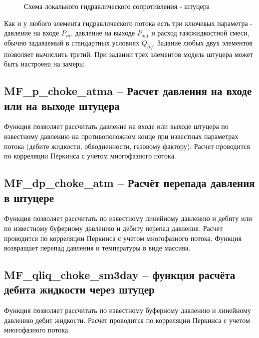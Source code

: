 \begin{figure}[h!]
\begin{center}
	
		\caption{Схема локального гидравлического сопротивления - штуцера}
		\label{ris:Pipe_choke}
		
	\end{center}
\end{figure}



Как и у любого элемента гидравлического потока есть три ключевых параметра - давление на входе \( P_{in} \), давление на выходе \(P_{out}\)  и расход газожидкостной смеси, обычно задаваемый в стандартных условиях \(Q_{liq} \). Задание любых двух элементов позволяет вычислить третий. При задании трех элементов модель штуцера может быть настроена на замеры.
 

\subsection{MF\_p\_choke\_atma – Расчет давления на входе или на выходе штуцера}
Функция позволяет рассчитать давление на входе или выходе штуцера по известному давлению на противоположном конце при известных параметрах потока (дебите жидкости, обводненности, газовому фактору). Расчет проводится по корреляции Перкинса \cite{Perkins_1993} с учетом многофазного потока.  

\subsection{MF\_dp\_choke\_atm – Расчёт перепада давления в штуцере}
Функция позволяет рассчитать по известному линейному давлению и дебиту или по известному буферному давлению и дебиту перепад давления.  Расчет проводится по корреляции Перкинса \cite{Perkins_1993} с учетом многофазного потока.  
Функция возвращает перепад давления и температуры в виде массива.


\subsection{MF\_qliq\_choke\_sm3day – функция расчёта дебита жидкости через штуцер}
Функция позволяет рассчитать по известному буферному давлению и линейному давлению дебит жидкости. Расчет проводится по корреляции Перкинса \cite{Perkins_1993} с учетом многофазного потока.  


